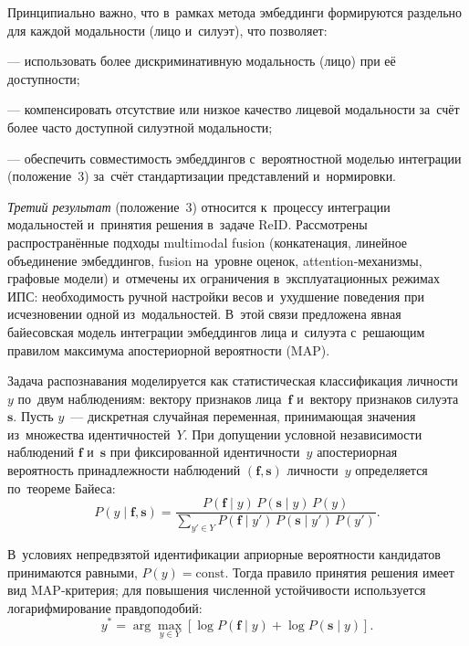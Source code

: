 Принципиально важно, что в~рамках метода эмбеддинги формируются раздельно
для каждой модальности (лицо и~силуэт), что позволяет:

--- использовать более дискриминативную модальность (лицо) при её доступности;

--- компенсировать отсутствие или низкое качество лицевой модальности за~счёт
более часто доступной силуэтной модальности;

--- обеспечить совместимость эмбеддингов с~вероятностной моделью интеграции
(положение~3) за~счёт стандартизации представлений и~нормировки.

\textit{Третий результат} (положение~3) относится к~процессу интеграции
модальностей и~принятия решения в~задаче ReID. Рассмотрены распространённые
подходы multimodal fusion (конкатенация, линейное объединение эмбеддингов,
fusion на~уровне оценок, attention‑механизмы, графовые модели) и~отмечены
их ограничения в~эксплуатационных режимах ИПС: необходимость ручной настройки
весов и~ухудшение поведения при исчезновении одной из~модальностей. В~этой
связи предложена явная байесовская модель интеграции эмбеддингов лица
и~силуэта с~решающим правилом максимума апостериорной вероятности (MAP).

Задача распознавания моделируется как статистическая классификация
личности~$y$ по~двум наблюдениям: вектору признаков лица~$\mathbf{f}$
и~вектору признаков силуэта~$\mathbf{s}$. Пусть $y$~--- дискретная случайная
переменная, принимающая значения из~множества идентичностей~$Y$.
При допущении условной независимости наблюдений $\mathbf{f}$ и~$\mathbf{s}$
при фиксированной идентичности~$y$ апостериорная вероятность принадлежности
наблюдений $(\mathbf{f},\mathbf{s})$ личности~$y$ определяется по~теореме
Байеса:
\begin{equation}
    P(y\mid \mathbf{f},\mathbf{s})=
    \frac{P(\mathbf{f}\mid y)\,P(\mathbf{s}\mid y)\,P(y)}
    {\sum\limits_{y'\in Y}P(\mathbf{f}\mid y')\,P(\mathbf{s}\mid y')\,P(y')}.
    \label{eq:bayes}
\end{equation}

В~условиях непредвзятой идентификации априорные вероятности кандидатов
принимаются равными, $P(y)=\mathrm{const}$. Тогда правило принятия решения
имеет вид MAP‑критерия; для повышения численной устойчивости используется
логарифмирование правдоподобий:
\begin{equation}
    y^*=\arg\max\limits_{y\in Y}
    \left[\log P(\mathbf{f}\mid y)+\log P(\mathbf{s}\mid y)\right].
    \label{eq:map}
\end{equation}

